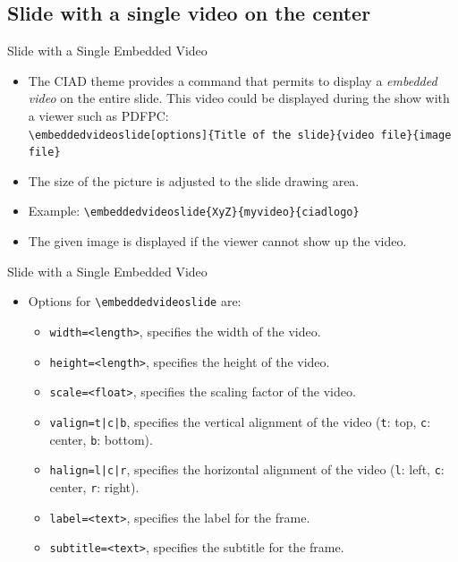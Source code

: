 \documentclass[english,sectioncirclenumberstyle]{ciadbeamer}
\begin{document}
\subsection{Slide with a single video on the center}
\subsectiontableofcontentslide

\begin{frame}{Slide with a Single Embedded Video}
	\begin{itemize}
	\item The CIAD theme provides a command that permits to display a \emph{embedded video} on the entire slide. This video could be displayed during the show with a viewer such as PDFPC: \\
		\texttt{{\textbackslash}embeddedvideoslide[options]\{Title of the slide\}\{video file\}\{image file\}}
	\item The size of the picture is adjusted to the slide drawing area.
	\item Example: \texttt{{\textbackslash}embeddedvideoslide\{XyZ\}\{myvideo\}\{ciadlogo\}} 
	\item The given image is displayed if the viewer cannot show up the video.
	\end{itemize}
\end{frame}

\begin{frame}{Slide with a Single Embedded Video \insertcontinuationtext}
	\begin{itemize}
	\item Options for \texttt{{\textbackslash}embeddedvideoslide} are:
		\begin{itemize}
		\item \texttt{width=<length>}, specifies the width of the video.
		\vfill
		\item \texttt{height=<length>}, specifies the height of the video.
		\vfill
		\item \texttt{scale=<float>}, specifies the scaling factor of the video.
		\vfill
		\item \texttt{valign=t|c|b}, specifies the vertical alignment of the video (\texttt{t}: top, \texttt{c}: center, \texttt{b}: bottom).
		\vfill
		\item \texttt{halign=l|c|r}, specifies the horizontal alignment of the video (\texttt{l}: left, \texttt{c}: center, \texttt{r}: right).
		\vfill
		\item \texttt{label=<text>}, specifies the label for the frame.
		\vfill
		\item \texttt{subtitle=<text>}, specifies the subtitle for the frame.
		\end{itemize}
	\end{itemize}
\end{frame}
\end{document}
